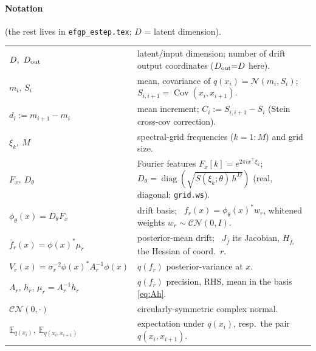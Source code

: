 \documentclass[11pt]{article}
\newcommand{\Eqx}{\mathbb{E}_{q(x_i)}}
\newcommand{\Eqxx}{\mathbb{E}_{q(x_i,x_{i+1})}}
\newcommand{\diag}{\operatorname{diag}}
\newcommand{\Cov}{\operatorname{Cov}}
\newcommand{\code}[1]{\texttt{#1}}
\newcommand{\Dt}{D_{\rm out}}
\begin{document}
\paragraph{Notation} (the rest lives in \texttt{efgp\_estep.tex}; $D$ = latent dimension).
\begin{center}\small
\renewcommand{\arraystretch}{1.25}
\begin{tabular}{@{}l p{}@{}}
\toprule
$D,\ \Dt$ & latent/input dimension; number of drift output coordinates ($\Dt{=}D$ here). \\
$m_i,\,S_i$ & mean, covariance of $q(x_i)=\mathcal N(m_i,S_i)$; \ $S_{i,i+1}=\Cov(x_i,x_{i+1})$. \\
$d_i:=m_{i+1}-m_i$ & mean increment; \quad $C_i:=S_{i,i+1}-S_i$ (Stein cross-cov correction). \\
$\xi_k,\ M$ & spectral-grid frequencies ($k{=}1{:}M$) and grid size. \\
$F_x,\ D_\theta$ & Fourier features $F_x[k]{=}e^{2\pi i x^\top\xi_k}$; \ $D_\theta{=}\diag(\sqrt{S(\xi_k;\theta)\,h^D})$ (real, diagonal; \code{grid.ws}). \\
$\phi_\theta(x){=}D_\theta F_x$ & drift basis; \ $f_r(x)=\phi_\theta(x)^*w_r$, whitened weights $w_r\sim\mathcal{CN}(0,I)$. \\
$\bar f_r(x){=}\phi(x)^*\mu_r$ & posterior-mean drift; \ $J_{\bar f}$ its Jacobian, $H_{\bar f_r}$ the Hessian of coord.\ $r$. \\
$V_r(x){=}\sigma_r^{-2}\phi(x)^*A_r^{-1}\phi(x)$ & $q(f_r)$ posterior-variance at $x$. \\
$A_r,\,h_r,\,\mu_r{=}A_r^{-1}h_r$ & $q(f_r)$ precision, RHS, mean in the basis \eqref{eq:Ah}. \\
$\mathcal{CN}(0,\cdot)$ & circularly-symmetric complex normal. \\
$\Eqx,\ \Eqxx$ & expectation under $q(x_i)$, resp.\ the pair $q(x_i,x_{i+1})$. \\
\bottomrule
\end{tabular}
\end{center}
\end{document}

